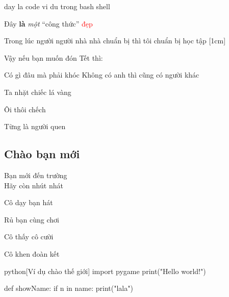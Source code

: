  day la code vi du trong bash shell

Đây \textbf{là} \textit{một} \enquote{công thức}  \textcolor{red}{đẹp} 

Trong lúc người người nhà nhà chuẩn bị  thì tôi chuẩn bị học tập [1cm]

Vậy nếu bạn muốn đón Tết thì:

\begin{remark}
    Có gì đâu mà phải khóc
    Không có anh thì cũng có người khác
\end{remark}

\begin{example}
    Ta nhặt chiếc lá vàng
\end{example}

\begin{problem}
    Ôi thôi chếch
\end{problem}

\begin{keypoints}

    Từng là người quen
\end{keypoints}

\subsection{Chào bạn mới}

Bạn mới đến trường \\
Hãy còn nhút nhát

Cô dạy bạn hát

Rủ bạn cùng chơi

Cô thấy cô cười

Cô khen đoàn kết


\begin{xcode}{python}[Ví dụ chào thế giới]
    import pygame
    print("Hello world!")      

    def showName:
        if n in name:
            print("lala")
\end{xcode}
